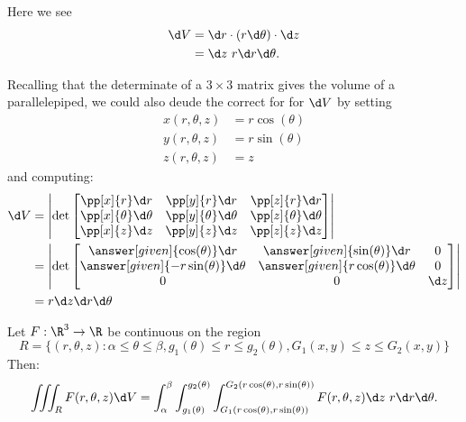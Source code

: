 \documentclass{ximera}
\begin{document}
\begin{image}
  \end{image}
Here we see 
\begin{align*}
\d V &= \d r \cdot (r \d \theta)\cdot \d z \\
&= \d z\ r \d r \d \theta.
\end{align*}

\begin{remark}
Recalling that the determinate of a $3\times 3$ matrix gives the volume of a parallelepiped, we could also deude the correct for for $\d V$ by setting
\begin{align*}
  x(r,\theta,z) &= r \cos(\theta)\\
  y(r,\theta,z) &= r \sin(\theta)\\
  z(r,\theta,z) &= z
\end{align*}
and computing:
\begin{align*}
  \d V &= \left| \det
  \begin{bmatrix}
    \pp[x]{r} \d r & \pp[y]{r} \d r & \pp[z]{r} \d r\\
    \pp[x]{\theta} \d \theta & \pp[y]{\theta} \d \theta & \pp[z]{\theta} \d \theta\\
    \pp[x]{z} \d z & \pp[y]{z} \d z & \pp[z]{z} \d z
  \end{bmatrix}
  \right|\\
  &= \left| \det
  \begin{bmatrix}
    \answer[given]{\cos(\theta)} \d r & \answer[given]{\sin(\theta)} \d r & 0 \\
    \answer[given]{-r\sin(\theta)} \d \theta & \answer[given]{r\cos(\theta)} \d \theta & 0\\
    0 & 0 & \d z
  \end{bmatrix}
  \right|\\
  &= r \d z\d r \d \theta
\end{align*}
\end{remark}

\begin{theorem}[Fubini]
  Let $F:\R^3\to\R$ be continuous on the region
  \[
  R=\{(r,\theta,z):\alpha\leq\theta\leq\beta, g_1(\theta)\leq r\leq g_2(\theta), G_1(x,y)\le z\le G_2(x,y)\}
  \]
  Then: 
  \[
  \iiint_R F(r,\theta,z)\d V = \int_\alpha^\beta\int_{g_1(\theta)}^{g_2(\theta)} \int_{G_1(r\cos(\theta),r\sin(\theta))}^{G_2(r\cos(\theta),r\sin(\theta))}F(r,\theta,z) \d z \ r\d r\d \theta.
  \]
\end{theorem}
\end{document}
